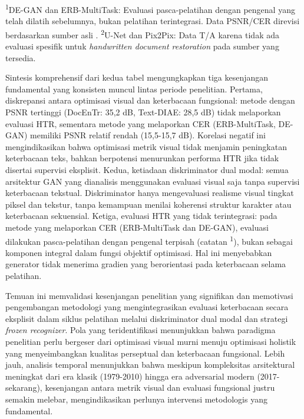 \documentclass[12pt,a4paper]{article}
\begin{document}
\begin{table}[htbp]
      \vspace{1ex}
      {\footnotesize\textsuperscript{1}DE-GAN dan ERB-MultiTask: Evaluasi pasca-pelatihan dengan pengenal yang telah dilatih sebelumnya, bukan pelatihan terintegrasi. Data PSNR/CER direvisi berdasarkan sumber asli \parencite{souibgui2021erb,souibgui2022docentr}.
      \textsuperscript{2}U-Net dan Pix2Pix: Data T/A karena tidak ada evaluasi spesifik untuk \textit{handwritten document restoration} pada sumber yang tersedia.}
\end{table}

Sintesis komprehensif dari kedua tabel mengungkapkan tiga kesenjangan fundamental yang konsisten muncul lintas periode penelitian. Pertama, diskrepansi antara optimisasi visual dan keterbacaan fungsional: metode dengan PSNR tertinggi (DocEnTr: 35,2 dB, Text-DIAE: 28,5 dB) tidak melaporkan evaluasi HTR, sementara metode yang melaporkan CER (ERB-MultiTask, DE-GAN) memiliki PSNR relatif rendah (15,5-15,7 dB). Korelasi negatif ini mengindikasikan bahwa optimisasi metrik visual tidak menjamin peningkatan keterbacaan teks, bahkan berpotensi menurunkan performa HTR jika tidak disertai supervisi eksplisit. Kedua, ketiadaan diskriminator dual modal: semua arsitektur GAN yang dianalisis menggunakan evaluasi visual saja tanpa supervisi keterbacaan tekstual. Diskriminator hanya mengevaluasi realisme visual tingkat piksel dan tekstur, tanpa kemampuan menilai koherensi struktur karakter atau keterbacaan sekuensial. Ketiga, evaluasi HTR yang tidak terintegrasi: pada metode yang melaporkan CER (ERB-MultiTask dan DE-GAN), evaluasi dilakukan pasca-pelatihan dengan pengenal terpisah (catatan \textsuperscript{1}), bukan sebagai komponen integral dalam fungsi objektif optimisasi. Hal ini menyebabkan generator tidak menerima gradien yang berorientasi pada keterbacaan selama pelatihan.

Temuan ini memvalidasi kesenjangan penelitian yang signifikan dan memotivasi pengembangan metodologi yang mengintegrasikan evaluasi keterbacaan secara eksplisit dalam siklus pelatihan melalui diskriminator dual modal dan strategi \textit{frozen recognizer}. Pola yang teridentifikasi menunjukkan bahwa paradigma penelitian perlu bergeser dari optimisasi visual murni menuju optimisasi holistik yang menyeimbangkan kualitas perseptual dan keterbacaan fungsional. Lebih jauh, analisis temporal menunjukkan bahwa meskipun kompleksitas arsitektural meningkat dari era klasik (1979-2010) hingga era adversarial modern (2017-sekarang), kesenjangan antara metrik visual dan evaluasi fungsional justru semakin melebar, mengindikasikan perlunya intervensi metodologis yang fundamental.
\end{document}
